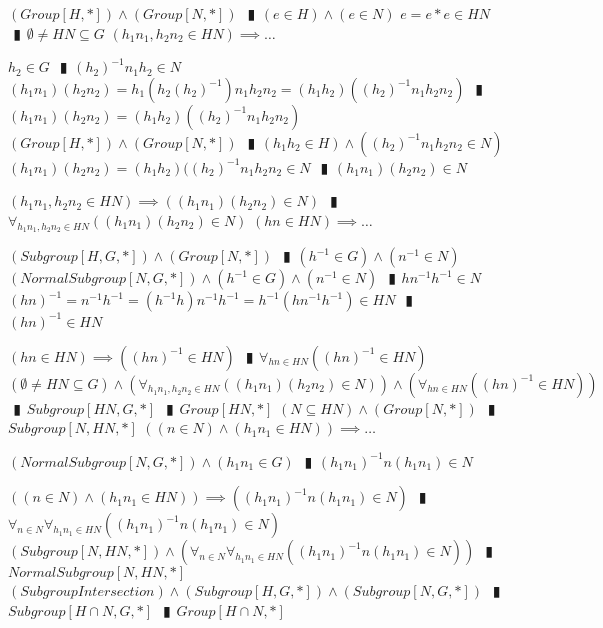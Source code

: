 \documentclass{book}
\newcommand{\pipe}{$\phantom{(}\vrectangleblack\phantom{)}$}
\newcommand{\pr}[1]{\left(#1\right)}
\begin{document}
\begin{enumerate}
  \lit $(Group[H, *]) \land (Group[N, *])$ \pipe $(e \in H) \land (e \in N)$
  \lit $e = e * e \in H N$ \pipe $\emptyset \neq H N \subseteq G$
  \lit $(h_1 n_1, h_2 n_2 \in H N) \implies \ldots$
  \begin{enumerate}
    \lit $h_2 \in G$ \pipe $(h_2)^{-1} n_1 h_2 \in N$
    \lit $(h_1 n_1) (h_2 n_2) = h_1 \pr{h_2 (h_2)^{-1}} n_1 h_2 n_2 = (h_1 h_2) \pr{(h_2)^{-1} n_1 h_2 n_2}$ \pipe $(h_1 n_1) (h_2 n_2) = (h_1 h_2) \pr{(h_2)^{-1} n_1 h_2 n_2}$
    \lit $(Group[H, *]) \land (Group[N, *])$ \pipe $(h_1 h_2 \in H) \land \pr{(h_2)^{-1} n_1 h_2 n_2 \in N}$
    \lit $(h_1 n_1) (h_2 n_2) = (h_1 h_2) ((h_2)^{-1} n_1 h_2 n_2 \in N$ \pipe $(h_1 n_1) (h_2 n_2) \in N$
  \end{enumerate}
  \lit $(h_1 n_1, h_2 n_2 \in H N) \implies \pr{(h_1 n_1) (h_2 n_2) \in N}$ \pipe $\forall_{h_1 n_1, h_2 n_2 \in H N}\pr{(h_1 n_1) (h_2 n_2) \in N}$
  \lit $(h n \in H N) \implies \ldots$
  \begin{enumerate}
    \lit $(Subgroup[H, G, *]) \land (Group[N, *])$ \pipe $(h^{-1} \in G) \land (n^{-1} \in N)$ 
    \lit $(NormalSubgroup[N, G, *]) \land (h^{-1} \in G) \land (n^{-1} \in N)$ \pipe  $h n^{-1} h^{-1} \in N$
    \lit $(h n)^{-1} = n^{-1} h^{-1} = (h^{-1} h) n^{-1} h^{-1} = h^{-1} (h n^{-1} h^{-1}) \in H N$ \pipe $(h n)^{-1} \in H N$
  \end{enumerate}
  \lit $(h n \in H N) \implies \pr{(h n)^{-1} \in H N}$ \pipe $\forall_{h n \in H N}\pr{(h n)^{-1} \in H N}$
  \lit $(\emptyset \neq H N \subseteq G) \land \pr{\forall_{h_1 n_1, h_2 n_2 \in H N}\pr{(h_1 n_1) (h_2 n_2) \in N}} \land \pr{\forall_{h n \in H N}\pr{(h n)^{-1} \in H N}}$ \pipe $Subgroup[H N, G, *]$ \pipe $Group[H N, *]$
  \lit $(N \subseteq H N) \land (Group[N, *])$ \pipe $Subgroup[N, H N, *]$
  \lit $\pr{(n \in N) \land (h_1 n_1 \in H N)} \implies \ldots$
  \begin{enumerate}
    \lit $(NormalSubgroup[N, G, *]) \land (h_1 n_1 \in G)$ \pipe $(h_1 n_1)^{-1} n (h_1 n_1) \in N$
  \end{enumerate}
  \lit $\pr{(n \in N) \land (h_1 n_1 \in H N)} \implies \pr{(h_1 n_1)^{-1} n (h_1 n_1) \in N}$ \pipe $\forall_{n \in N} \forall_{h_1 n_1 \in H N}\pr{(h_1 n_1)^{-1} n (h_1 n_1) \in N}$
  \lit $(Subgroup[N, H N, *]) \land \pr{\forall_{n \in N} \forall_{h_1 n_1 \in H N}\pr{(h_1 n_1)^{-1} n (h_1 n_1) \in N}}$ \pipe $NormalSubgroup[N, H N, *]$
  \lit $(SubgroupIntersection) \land (Subgroup[H, G, *]) \land (Subgroup[N, G, *])$ \pipe $Subgroup[H \cap N, G, *]$ \pipe $Group[H \cap N, *]$

\end{enumerate}
\end{document}
